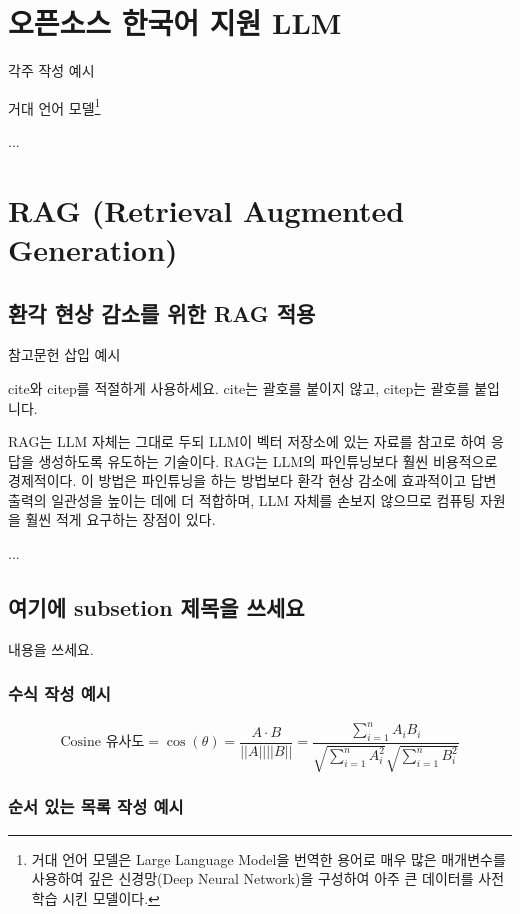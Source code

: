 \section{오픈소스 한국어 지원 LLM}

각주 작성 예시

거대 언어 모델\footnote{거대 언어 모델은 Large Language Model을 번역한 용어로 매우 많은 매개변수를 사용하여 깊은 신경망(Deep Neural Network)을 구성하여 아주 큰 데이터를 사전학습 시킨 모델이다\citep{chang2024}.}

...

\section{RAG (Retrieval Augmented Generation)}

\subsection{환각 현상 감소를 위한 RAG 적용}

참고문헌 삽입 예시

cite와 citep를 적절하게 사용하세요. cite는 괄호를 붙이지 않고, citep는 괄호를 붙입니다.

RAG는 LLM 자체는 그대로 두되 LLM이 벡터 저장소에 있는 자료를 참고로 하여 응답을 생성하도록 유도하는 기술이다\citep{amazon2024-rag}. RAG는 LLM의 파인튜닝보다 훨씬 비용적으로 경제적이다. 이 방법은 파인튜닝을 하는 방법보다 환각 현상 감소에 효과적이고 답변 출력의 일관성을 높이는 데에 더 적합하며\citep{sonjiwon2024}, LLM 자체를 손보지 않으므로 컴퓨팅 자원을 훨씬 적게 요구하는 장점이 있다\citep{amazon2024-rag}.

...

\subsection{여기에 subsetion 제목을 쓰세요}

내용을 쓰세요.

\subsubsection{수식 작성 예시}

$$\text{Cosine 유사도} = \cos(\theta) = \frac{A \cdot B}{||A|| ||B||} = \frac{\sum_{i=1}^{n} A_i B_i}{\sqrt{\sum_{i=1}^{n} A_i^2} \sqrt{\sum_{i=1}^{n} B_i^2}}$$

\subsubsection{순서 있는 목록 작성 예시}

